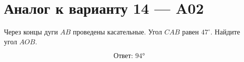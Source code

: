 


\section*{Аналог к варианту 14 — A02}
Через концы дуги \(AB\) проведены касательные. Угол \(CAB\) равен \(47^\circ\). Найдите угол \(AOB\).
\begin{center}\figTangentPair\end{center}
\[\boxed{\text{Ответ: }94°}\]


